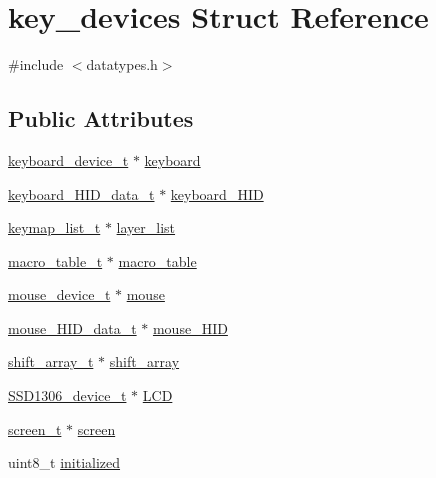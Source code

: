 \hypertarget{structkey__devices}{}\section{key\+\_\+devices Struct Reference}
\label{structkey__devices}


{\ttfamily \#include $<$datatypes.\+h$>$}

\subsection*{Public Attributes}
\begin{DoxyCompactItemize}
\item 
\hyperlink{datatypes_8h_a903f583e3cefd5881572b61025c5416f}{keyboard\+\_\+device\+\_\+t} $\ast$ \hyperlink{structkey__devices_ac02e9ecf84780350f27db0549146f2a6}{keyboard}
\item 
\hyperlink{datatypes_8h_ab6ae011601a0fec803428af1f5920fc0}{keyboard\+\_\+\+H\+I\+D\+\_\+data\+\_\+t} $\ast$ \hyperlink{structkey__devices_a2989d445521451652ded8764f28d930e}{keyboard\+\_\+\+H\+ID}
\item 
\hyperlink{datatypes_8h_ac282a7a696b1d7d36df8c0f4ebce07e7}{keymap\+\_\+list\+\_\+t} $\ast$ \hyperlink{structkey__devices_afb6ce3bdf6b2aeaa8b11064dea22fb5d}{layer\+\_\+list}
\item 
\hyperlink{datatypes_8h_a3bff27935e5dc89e910e1e2e4d3f7abe}{macro\+\_\+table\+\_\+t} $\ast$ \hyperlink{structkey__devices_a9f7692e28c20c214b10d8a495d39332a}{macro\+\_\+table}
\item 
\hyperlink{datatypes_8h_a0d85f13732d58fd4ceda707f96f9e6cc}{mouse\+\_\+device\+\_\+t} $\ast$ \hyperlink{structkey__devices_acc3c9006c806b62f7f84836bd38bfbd7}{mouse}
\item 
\hyperlink{datatypes_8h_ae33b283ee7c4c33b95f8c0d26001d642}{mouse\+\_\+\+H\+I\+D\+\_\+data\+\_\+t} $\ast$ \hyperlink{structkey__devices_ae1d2b233c86909a36b4010241056d498}{mouse\+\_\+\+H\+ID}
\item 
\hyperlink{datatypes_8h_adb530ee69b7a28ad91cf00a7c665a2f5}{shift\+\_\+array\+\_\+t} $\ast$ \hyperlink{structkey__devices_a2d89c37a95b62f18c39802dcd775849a}{shift\+\_\+array}
\item 
\hyperlink{datatypes_8h_afa3700e77990b75b3fcc954070aa90fe}{S\+S\+D1306\+\_\+device\+\_\+t} $\ast$ \hyperlink{structkey__devices_adef22ef174a01f21e4b51284247480b2}{L\+CD}
\item 
\hyperlink{datatypes_8h_a2b884fb4031189ae0bf89d344e558973}{screen\+\_\+t} $\ast$ \hyperlink{structkey__devices_aa7d66258cb8699504a5b7b5ca79312a2}{screen}
\item 
uint8\+\_\+t \hyperlink{structkey__devices_aa231e29163c11607a75536f9e7bed876}{initialized}
\end{DoxyCompactItemize}


